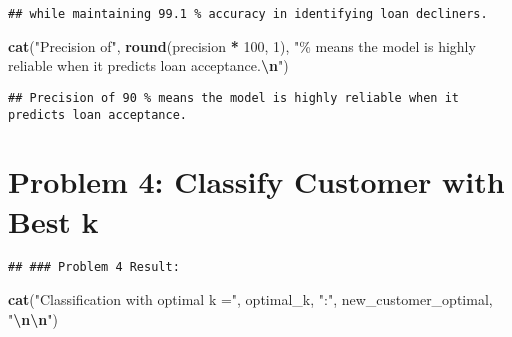 \documentclass[
]{article}
\newenvironment{Shaded}{\begin{snugshade}}{\end{snugshade}}
\newcommand{\AttributeTok}[1]{\textcolor[rgb]{0.13,0.29,0.53}{#1}}
\newcommand{\CommentTok}[1]{\textcolor[rgb]{0.56,0.35,0.01}{\textit{#1}}}
\newcommand{\DecValTok}[1]{\textcolor[rgb]{0.00,0.00,0.81}{#1}}
\newcommand{\FunctionTok}[1]{\textcolor[rgb]{0.13,0.29,0.53}{\textbf{#1}}}
\newcommand{\NormalTok}[1]{#1}
\newcommand{\OtherTok}[1]{\textcolor[rgb]{0.56,0.35,0.01}{#1}}
\newcommand{\SpecialCharTok}[1]{\textcolor[rgb]{0.81,0.36,0.00}{\textbf{#1}}}
\newcommand{\StringTok}[1]{\textcolor[rgb]{0.31,0.60,0.02}{#1}}
\begin{document}
\begin{verbatim}
## while maintaining 99.1 % accuracy in identifying loan decliners.
\end{verbatim}

\begin{Shaded}
\begin{Highlighting}[]
\FunctionTok{cat}\NormalTok{(}\StringTok{"Precision of"}\NormalTok{, }\FunctionTok{round}\NormalTok{(precision }\SpecialCharTok{*} \DecValTok{100}\NormalTok{, }\DecValTok{1}\NormalTok{), }\StringTok{"\% means the model is highly reliable when it predicts loan acceptance.}\SpecialCharTok{\textbackslash{}n}\StringTok{"}\NormalTok{)}
\end{Highlighting}
\end{Shaded}

\begin{verbatim}
## Precision of 90 % means the model is highly reliable when it predicts loan acceptance.
\end{verbatim}

\section{Problem 4: Classify Customer with Best
k}\label{problem-4-classify-customer-with-best-k}

\begin{Shaded}
\end{Shaded}

\begin{verbatim}
## ### Problem 4 Result:
\end{verbatim}

\begin{Shaded}
\begin{Highlighting}[]
\FunctionTok{cat}\NormalTok{(}\StringTok{"Classification with optimal k ="}\NormalTok{, optimal\_k, }\StringTok{":"}\NormalTok{, new\_customer\_optimal, }\StringTok{"}\SpecialCharTok{\textbackslash{}n\textbackslash{}n}\StringTok{"}\NormalTok{)}
\end{Highlighting}
\end{Shaded}
\end{document}
